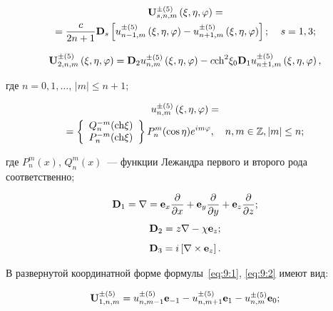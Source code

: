 \begin{russian}
\begin{multline}
{\bf{U}}_{s,n,m}^{ \pm (5)}\left( {\xi ,\eta ,\varphi } \right) = \\
= \frac{c}{{2n + 1}}{{\bf{D}}_s}\left[ {u_{n - 1,m}^{ \pm (5)}\left( {\xi ,\eta ,\varphi } \right) - u_{n + 1,m}^{ \pm (5)}\left( {\xi ,\eta ,\varphi } \right)} \right];\quad {\kern 1pt} s = 1,3;
\label{eq:9:1}
\end{multline}

\begin{equation}
{\bf{U}}_{2,n,m}^{ \pm (5)}\left( {\xi ,\eta ,\varphi } \right) = {{\bf{D}}_2}u_{n,m}^{ \pm (5)}\left( {\xi ,\eta ,\varphi } \right) - c{{\mathop{\rm ch}\nolimits} ^2}{\xi _0}{{\bf{D}}_1}u_{n \pm 1,m}^{ \pm (5)}\left( {\xi ,\eta ,\varphi } \right),
\label{eq:9:2}
\end{equation}

\noindent где $n=0,1,\dots$, $|m|\le n+1$;

\begin{multline}
u_{n,m}^{ \pm (5)}\left( {\xi ,\eta ,\varphi } \right) = \\
= \left\{ \begin{array}{l}
Q_n^{ - m}({\mathop{\rm ch}\nolimits} \xi )\\
P_n^{ - m}({\mathop{\rm ch}\nolimits} \xi )
\end{array} \right\}P_n^m(\cos \eta ){e^{im\varphi }},\quad n,m \in \mathbb{Z}, |m| \le n;
\end{multline}

\noindent где $P_n^m(x)$, $Q_n^m(x)$~--- функции Лежандра первого и второго рода соответственно;

\begin{equation}
{{\bf{D}}_1} = \nabla  = {{\bf{e}}_x}\frac{\partial }{{\partial x}} + {{\bf{e}}_y}\frac{\partial }{{\partial y}} + {{\bf{e}}_z}\frac{\partial }{{\partial z}};
\label{eq:9:23a}
\end{equation}
\begin{equation}
{{\bf{D}}_2} = z\nabla  - \chi {{\bf{e}}_z};
\label{eq:9:23b}
\end{equation}
\begin{equation}
{{\bf{D}}_3} = i\left[ {\nabla  \times {{\bf{e}}_z}} \right].
\label{eq:9:23c}
\end{equation}

В развернутой координатной форме формулы~\eqref{eq:9:1}, \eqref{eq:9:2} имеют вид:

\begin{equation}
{\bf{U}}_{1,n,m}^{ \pm (5)} = u_{n,m - 1}^{ \pm (5)}{{\bf{e}}_{ - 1}} - u_{n,m + 1}^{ \pm (5)}{{\bf{e}}_1} - u_{n,m}^{ \pm (5)}{{\bf{e}}_0};
\end{equation}


\end{russian}
